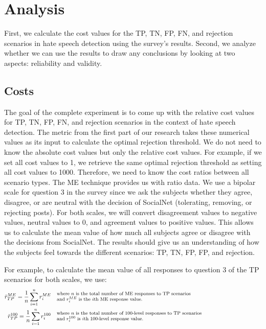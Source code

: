 \documentclass[a4paper]{article}
\begin{document}
\section{Analysis}
First, we calculate the cost values for the TP, TN, FP, FN, and rejection scenarios in hate speech detection using the survey's results. Second, we analyze whether we can use the results to draw any conclusions by looking at two aspects: reliability and validity.

\subsection{Costs}
\label{sec:analysis-costs}
The goal of the complete experiment is to come up with the relative cost values for TP, TN, FP, FN, and rejection scenarios in the context of hate speech detection. The metric from the first part of our research takes these numerical values as its input to calculate the optimal rejection threshold. We do not need to know the absolute cost values but only the relative cost values. For example, if we set all cost values to 1, we retrieve the same optimal rejection threshold as setting all cost values to 1000. Therefore, we need to know the cost ratios between all scenario types. The ME technique provides us with ratio data. We use a bipolar scale for question 3 in the survey since we ask the subjects whether they agree, disagree, or are neutral with the decision of SocialNet (tolerating, removing, or rejecting posts). For both scales, we will convert disagreement values to negative values, neutral values to 0, and agreement values to positive values. This allows us to calculate the mean value of how much all subjects agree or disagree with the decisions from SocialNet. The results should give us an understanding of how the subjects feel towards the different scenarios: TP, TN, FP, FP, and rejection.

For example, to calculate the mean value of all responses to question 3 of the TP scenarios for both scales, we use:
\begin{align*}
    \bar{r}_{TP}^{ME} = \frac{1}{n} \sum_{i=1}^{n} r_i^{ME}   & \quad  \parbox{35em}{\footnotesize where $n$ is the total number of ME responses to TP scenarios       \\and $r_i^{ME}$ is the $i$th ME response value.}\\
    \bar{r}_{TP}^{100} = \frac{1}{n} \sum_{i=1}^{n} r_i^{100} & \quad \parbox{35em}{\footnotesize where $n$ is the total number of 100-level responses to TP scenarios \\and $r_i^{100}$ is $i$th 100-level response value.}
\end{align*}
\end{document}
